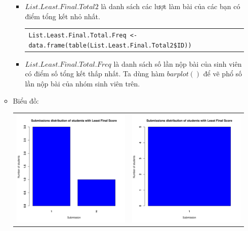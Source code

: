 \documentclass[a4paper]{article}
\theoremstyle{definition}
\begin{document}
\begin{enumerate}[a)]
\begin{itemize}
\begin{itemize}
\begin{center}
\begin{tabular}{p{13cm}}
                \end{tabular}
            \end{center}
            \item $List.Least.Final.Total2$ là danh sách các lượt làm bài của các bạn có điểm tổng kết nhỏ nhất.
            \begin{center}
                \begin{tabular}{p{13cm}}
                    \texttt{List.Least.Final.Total.Freq <- data.frame(table(List.Least.Final.Total2\$ID))}
                \end{tabular}
            \end{center}
            \item $List.Least.Final.Total.Freq$ là danh sách số lần nộp bài của sinh viên có điểm số tổng kết thấp nhất. Ta dùng hàm $barplot()$ để vẽ phổ số lần nộp bài của nhóm sinh viên trên.
        \end{itemize}
        \item Biểu đồ:\\
        \begin{center}
            \begin{tabular}{c c}
                 \includegraphics[width = 6.9cm]{Images/img2-2-1.png} & \includegraphics[width = 6.9cm]{Images/img2-2-2.png} \\

\end{tabular}
\end{center}
\end{itemize}
\end{enumerate}
\end{document}

